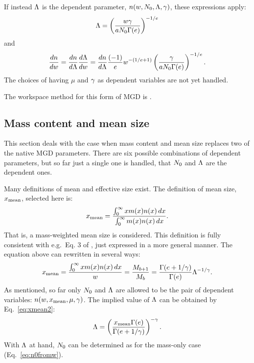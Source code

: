 If instead $\Lambda$ is the dependent parameter, $n(w,N_0,\Lambda,\gamma)$, these expressions apply:
\begin{equation}
  \Lambda = \left( \frac{w\gamma}{aN_0\Gamma(e)} \right)^{-1/e}
  \label{eq:mass:la}
\end{equation}
and
\begin{equation}
  \frac{dn}{dw} = \frac{dn}{d\Lambda}\frac{d\Lambda}{dw} = \frac{dn}{d\Lambda} 
  \frac{(-1)}{e}w^{-(1/e+1)}\left( \frac{\gamma}{aN_0\Gamma(e)} \right)^{-1/e}.
\end{equation}
The choices of having $\mu$ and $\gamma$ as dependent variables are not yet
handled. 

The workspace method for this form of MGD is .



\subsection{Mass content and mean size}
%
This section deals with the case when mass content and mean size replaces two
of the native MGD parameters. There are six possible combinations of 
dependent parameters, but so far just a single one is handled, that $N_0$ and
$\Lambda$ are the dependent ones. 

Many definitions of mean and effective size exist. The definition of mean size,
$x_\mathrm{mean}$, selected here is:
\begin{equation}
  x_\mathrm{mean} =\frac{\int_0^\infty x m(x) n(x)\,dx}{\int_0^\infty m(x) n(x)\,dx}.
\end{equation}
That is, a mass-weighted mean size is considered. This definition is fully
consistent with e.g.\ Eq. 3 of \citet{delanoe2014normalized}, just expressed
in a more general manner. The equation above can rewritten in several ways:
\begin{equation}
  x_\mathrm{mean} =\frac{\int_0^\infty x m(x) n(x)\,dx}{w}=\frac{M_{b+1}}{M_b}=
  \frac{\Gamma(e+1/\gamma)}{\Gamma(e)} \Lambda^{-1/\gamma}.
  \label{eq:xmean2}
\end{equation}
As mentioned, so far only $N_0$ and $\Lambda$ are allowed to be the pair of
dependent variables: $n(w,x_\mathrm{mean},\mu,\gamma)$. The implied value of $\Lambda$ can be
obtained by Eq.~\ref{eq:xmean2}:
\begin{equation}
  \Lambda = \left( \frac{x_\mathrm{mean}\Gamma(e)}{\Gamma(e+1/\gamma)}\right)^{-\gamma}.
\end{equation}
With $\Lambda$ at hand, $N_0$ can be determined as for the mass-only case
(Eq.~\ref{eq:n0fromw}).

